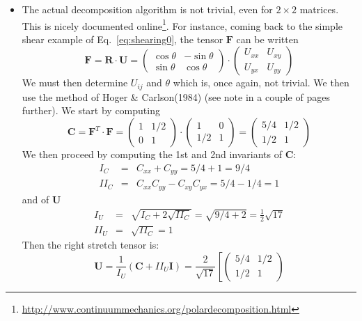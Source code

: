 \begin{itemize}
\item
The actual decomposition algorithm is not trivial, 
even for $2\times2$ matrices. This is nicely documented 
online\footnote{\url{http://www.continuummechanics.org/polardecomposition.html}}.
For instance, coming back to the simple shear example of Eq.~\eqref{eq:shearing0}, 
the tensor ${\bm F}$ can be written 
\[
{\bm F}= {\bm R} \cdot {\bm U}
=
\left(
\begin{array}{cc}
\cos\theta & -\sin\theta \\
\sin\theta & \cos\theta 
\end{array}
\right)
\cdot
\left(
\begin{array}{cc}
U_{xx} & U_{xy} \\
U_{yx} & U_{yy} 
\end{array}
\right)
\]
We must then determine $U_{ij}$ and $\theta$ which is, once again, not trivial. We then use the method 
of Hoger \& Carlson(1984) \cite{hoca84} (see note in a couple of pages further). We start by computing
\[
{\bm C} =
 {\bm F}^T\cdot{\bm F}
=
\left(
\begin{array}{cc}
1 & 1/2 \\ 
0 & 1
\end{array}
\right)
\cdot
\left(
\begin{array}{cc}
1 & 0 \\ 
1/2 & 1
\end{array}
\right)
=
\left(
\begin{array}{cc}
5/4 & 1/2 \\ 
1/2 & 1
\end{array}
\right)
\]
We then proceed by computing the 1st and 2nd invariants of ${\bm C}$:
\begin{eqnarray}
I_C &=&C_{xx}+C_{yy}=5/4+1=9/4 \nonumber\\
II_C&=&C_{xx}C_{yy}-C_{xy}C_{yx} = 5/4-1/4 = 1 \nonumber
\end{eqnarray}
and of ${\bm U}$
\begin{eqnarray}
I_U &=&\sqrt{I_C + 2 \sqrt{II_C}} = \sqrt{9/4 + 2 }= \frac{1}{2}\sqrt{17} \nonumber\\
II_U&=&\sqrt{II_C} = 1 \nonumber
\end{eqnarray}
Then the right stretch tensor is:
\[
{\bm U} = \frac{1}{I_U}({\bm C} + II_U {\bm I})
=
\frac{2}{\sqrt{17}}  \left[ 
\left(
\begin{array}{cc}
5/4 & 1/2 \\ 
1/2 & 1
\end{array}
\right)
\]
\end{itemize}
